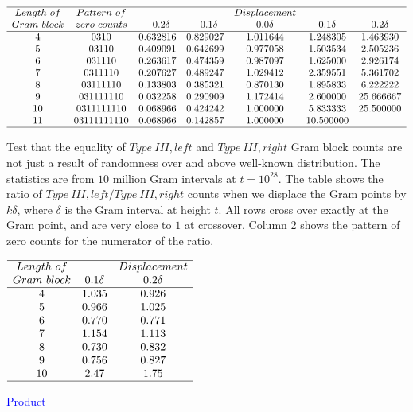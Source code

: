 \documentclass[twoside]{article}
\theoremstyle{definition}
\begin{document}
\begin{table}
\centering \(\begin{array}{ccccccc}
\hline
Length~of&Pattern~of& &&Displacement \\
Gram~block&zero~counts	& -0.2\delta & -0.1\delta & 0.0\delta & 0.1\delta & 0.2\delta  \\
\hline
4 &0310&0.632816&0.829027&1.011644&1.248305&1.463930 \\
5 &03110&0.409091&0.642699&0.977058&1.503534&2.505236 \\
6 &031110&0.263617&0.474359&0.987097&1.625000&2.926174 \\
7 &0311110&0.207627&0.489247&1.029412&2.359551&5.361702 \\
8 &03111110&0.133803&0.385321&0.870130&1.895833&6.222222 \\
9 &031111110&0.032258&0.290909&1.172414&2.600000&25.666667 \\
10 &0311111110&0.068966&0.424242&1.000000&5.833333&25.500000 \\
11 &03111111110&0.068966&0.142857&1.000000&10.500000& \\
\hline
\end{array}\)
\caption{Test that the equality of  $Type~III,left$ and $Type~III,right$ Gram block counts are not just a result of randomness over and above well-known distribution. The statistics are from $10$ million Gram intervals at $t=10^{28}$. The table shows the ratio of $Type~III,left/Type~III,right$ counts when we displace the Gram points by $k\delta$, 
where $\delta$ is the Gram interval at height $t$. All rows cross over exactly at the Gram point, and are very close to $1$ at crossover.  Column $2$ shows the pattern of zero counts for the numerator of the ratio.  } 
\label{tab:rosser3random}
\end{table}

\begin{table}
\centering \(\begin{array}{ccc}
\hline
Length~of 	& &Displacement \\
Gram~block	 & 0.1\delta & 0.2\delta  \\
\hline
4 &1.035 & 0.926\\
5 &0.966& 1.025\\ 
6 &0.770& 0.771\\
7 &1.154& 1.113\\
8 &0.730& 0.832\\
9 &0.756& 0.827\\
10 &2.47& 1.75\\
\hline
\end{array}\)
\caption{ \textcolor{blue}{Product}}
\label{tab:rosser3product}
\end{table}
\end{document}
